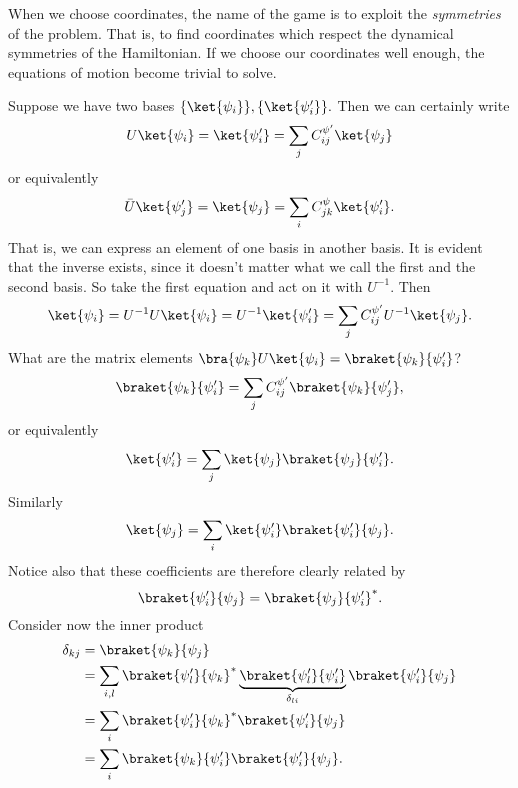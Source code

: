 When we choose coordinates, the name of the game is to exploit the \emph{symmetries} of the problem. That is, to find coordinates which respect the dynamical symmetries of the Hamiltonian. If we choose our coordinates well enough, the equations of motion become trivial to solve.

Suppose we have two bases $\set{\ket{\psi_i}},\set{\ket{\psi_i'}}.$ Then we can certainly write
\begin{equation}
	U\ket{\psi_i} =  \ket{\psi_i'}=\sum_j C_{ij}^{\psi'} \ket{\psi_j}
\end{equation}
or equivalently
\begin{equation}
	\bar U \ket{\psi_j'}=\ket{\psi_j} = \sum_i C_{jk}^\psi \ket{\psi'_i}.
\end{equation}
That is, we can express an element of one basis in another basis. It is evident that the inverse exists, since it doesn't matter what we call the first and the second basis. So take the first equation and act on it with $U^{-1}$. Then
\begin{equation}
	\ket{\psi_i} = U^{-1} U \ket{\psi_i}  = U^{-1} \ket{\psi_i'} = \sum_j C_{ij}^{\psi'} U^{-1} \ket{\psi_j}.
\end{equation}
What are the matrix elements $\bra{\psi_k}U\ket{\psi_i}=\braket{\psi_k}{\psi_i'}$?
\begin{equation}
	\braket{\psi_k}{\psi_i'} = \sum_j C_{ij}^{\psi'}\braket{\psi_k}{\psi_j'},
\end{equation}
or equivalently
\begin{equation}
	\ket{\psi_i'} = \sum_j \ket{\psi_j} \braket{\psi_j}{\psi_i'}.
\end{equation}
Similarly
\begin{equation}
	\ket{\psi_j} = \sum_i \ket{\psi_i'} \braket{\psi_i' }{\psi_j}.
\end{equation}
Notice also that these coefficients are therefore clearly related by 
\begin{equation}
	\braket{\psi_i'}{\psi_j} = \braket{\psi_j}{\psi_i'}^*.
\end{equation}
Consider now the inner product
\begin{align*}
	\delta_{kj} & = \braket{\psi_k }{\psi_j}\\
		&= \sum_{i,l} \braket{\psi_l'}{\psi_k}^* \underbrace{\braket{\psi_l'}{\psi_i'}}_{\delta_{li}} \braket{\psi_i'}{\psi_j}\\
		&= \sum_i \braket{\psi_i'}{\psi_k}^*\braket{\psi_i'}{\psi_j}\\
		&= \sum_i \braket{\psi_k}{\psi_i'} \braket{\psi_i'}{\psi_j}.
\end{align*}
